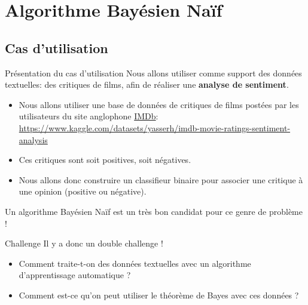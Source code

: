 \documentclass[10pt]{beamer}  %
\begin{document}

\section[Algorithme Bayésien Naïf]{Algorithme Bayésien Naïf}

\subsection[Cas d'utilisation]{Cas d'utilisation}

\begin{frame}{Présentation du cas d'utilisation}
	Nous allons utiliser comme support des données textuelles: des critiques de films, afin de réaliser une \textbf{analyse de sentiment}.
	\begin{itemize}
		\item Nous allons utiliser une base de données de critiques de films postées par les utilisateurs du site anglophone \href{https://m.imdb.com/}{IMDb}: \url{https://www.kaggle.com/datasets/yasserh/imdb-movie-ratings-sentiment-analysis}
		\item Ces critiques sont soit positives, soit négatives.
		\item Nous allons donc construire un classifieur binaire pour associer une critique à une opinion (positive ou négative).
	\end{itemize}
	Un algorithme Bayésien Naïf est un très bon candidat pour ce genre de problème ! 
\end{frame}

\begin{frame}{Challenge}
	Il y a donc un double challenge !
	\begin{itemize}
		\item Comment traite-t-on des données textuelles avec un algorithme d'apprentissage automatique ?
		\item Comment est-ce qu'on peut utiliser le théorème de Bayes avec ces données ?
	\end{itemize}
\end{frame}
\end{document}
